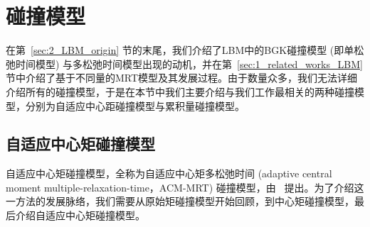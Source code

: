 \section{碰撞模型}
在第~\ref{sec:2_LBM_origin} 节的末尾，我们介绍了LBM中的BGK碰撞模型 (即单松弛时间模型) 与多松弛时间模型出现的动机，并在第~\ref{sec:1_related_works_LBM} 节中介绍了基于不同量的MRT模型及其发展过程。由于数量众多，我们无法详细介绍所有的碰撞模型，于是在本节中我们主要介绍与我们工作最相关的两种碰撞模型，分别为自适应中心距碰撞模型与累积量碰撞模型。

\subsection{自适应中心矩碰撞模型}
自适应中心矩碰撞模型，全称为自适应中心矩多松弛时间 (adaptive central moment multiple-relaxation-time，ACM-MRT) 碰撞模型，由~\cite{Li-2020} 提出。为了介绍这一方法的发展脉络，我们需要从原始矩碰撞模型开始回顾，到中心矩碰撞模型，最后介绍自适应中心矩碰撞模型。

